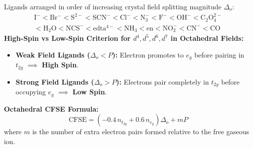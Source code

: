 \documentclass[10pt,twoside,openright]{book}
\begin{document}
\begin{formulabox}
Ligands arranged in order of increasing crystal field splitting magnitude $\Delta_o$:
\begin{align}
  \mathrm{I^- < Br^- < S^{2-} < SCN^- < Cl^- < N_3^- < F^- < OH^- < C_2O_4^{2-}} \nonumber \\
  {} < \mathrm{H_2O < NCS^- < edta^{4-} < NH_3 < en < NO_2^- < CN^- < CO}
\end{align}
\textbf{High-Spin vs Low-Spin Criterion for $d^4, d^5, d^6, d^7$ in Octahedral Fields:}
\begin{itemize}
  \item \textbf{Weak Field Ligands ($\Delta_o < P$):} Electron promotes to $e_g$ before pairing in $t_{2g}$ $\implies$ \textbf{High Spin}.
  \item \textbf{Strong Field Ligands ($\Delta_o > P$):} Electrons pair completely in $t_{2g}$ before occupying $e_g$ $\implies$ \textbf{Low Spin}.
\end{itemize}
\textbf{Octahedral CFSE Formula:}
\begin{equation}
  \text{CFSE} = \left(-0.4\,n_{t_{2g}} + 0.6\,n_{e_g}\right)\Delta_o + m P
\end{equation}
where $m$ is the number of extra electron pairs formed relative to the free gaseous ion.
\end{formulabox}
\end{document}
